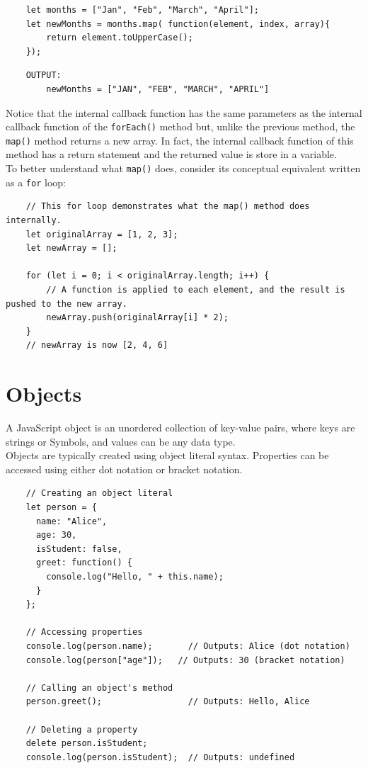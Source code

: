 \documentclass{scrbook}
\begin{document}
\begin{lstlisting}
    let months = ["Jan", "Feb", "March", "April"];
    let newMonths = months.map( function(element, index, array){
        return element.toUpperCase();
    });
\end{lstlisting}

\begin{lstlisting}
    OUTPUT:
        newMonths = ["JAN", "FEB", "MARCH", "APRIL"]
\end{lstlisting}

Notice that the internal callback function has the same parameters as the internal callback function of the \texttt{forEach()} method but, unlike the previous method, the \texttt{map()} method returns a new array. In fact, the internal callback function of this method has a return statement and the returned value is store in a variable.\\

To better understand what \texttt{map()} does, consider its conceptual equivalent written as a \texttt{for} loop:

\begin{lstlisting}
    // This for loop demonstrates what the map() method does internally.
    let originalArray = [1, 2, 3];
    let newArray = [];
    
    for (let i = 0; i < originalArray.length; i++) {
        // A function is applied to each element, and the result is pushed to the new array.
        newArray.push(originalArray[i] * 2);
    }
    // newArray is now [2, 4, 6]
\end{lstlisting}

\section{Objects}

A JavaScript object is an unordered collection of key-value pairs, where keys are strings or Symbols, and values can be any data type.\\

Objects are typically created using object literal syntax. Properties can be accessed using either dot notation or bracket notation.

\begin{lstlisting}
    // Creating an object literal
    let person = {
      name: "Alice",
      age: 30,
      isStudent: false,
      greet: function() {
        console.log("Hello, " + this.name);
      }
    };
    
    // Accessing properties
    console.log(person.name);       // Outputs: Alice (dot notation)
    console.log(person["age"]);   // Outputs: 30 (bracket notation)
    
    // Calling an object's method
    person.greet();                 // Outputs: Hello, Alice
    
    // Deleting a property
    delete person.isStudent;
    console.log(person.isStudent);  // Outputs: undefined
\end{lstlisting}
\end{document}
